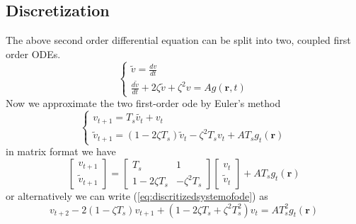 \documentclass[a4paper,10pt]{article}
\begin{document}
\subsection*{Discretization}
The above second order differential equation can be split into two, coupled first order ODEs.\\
\begin{equation}\label{eq:systemofode}
\begin{cases}
\tilde{v}=\frac{dv}{dt} \\
\frac{d\tilde{v}}{dt}+2\zeta\tilde{v}+\zeta^2v=Ag\left( \mathbf{r},t \right)
\end{cases}
\end{equation}
Now we approximate the two first-order ode by Euler's method
\begin{equation}\label{eq:discritizedsystemofode}
\begin{cases}
v_{t+1}=T_s\tilde{v_t}+v_t\\
\tilde{v}_{t+1}=(1-2\zeta T_s)\tilde{v}_t-\zeta^2T_sv_t+AT_sg_t\left( \mathbf{r}\right)
\end{cases}
\end{equation}
in matrix format we have
\begin{equation}
 \begin{bmatrix}v_{t+1} \\ \tilde{v}_{t+1}\end{bmatrix}= \begin{bmatrix} T_s &1\\ 1-2\zeta T_s & -\zeta^2T_s\end{bmatrix}\begin{bmatrix}v_{t} \\ \tilde{v}_{t}\end{bmatrix}+AT_sg_t\left( \mathbf{r}\right)
\end{equation}
or alternatively we can write (\ref{eq:discritizedsystemofode}) as
\begin{equation}\label{eq:DifferenceModel}
 v_{t+2}-2(1-\zeta T_s)v_{t+1}+(1-2\zeta T_s+\zeta^2T_s^2)v_t=AT_s^2g_t\left( \mathbf{r}\right)
\end{equation}
\end{document}
